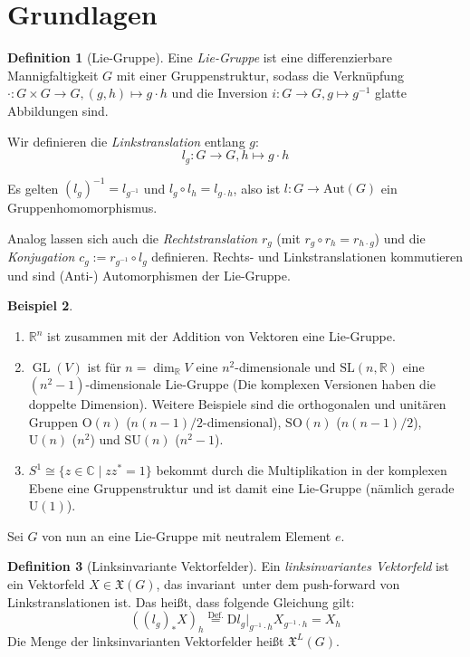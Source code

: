 \documentclass[a4paper]{scrreprt}
\numberwithin{equation}{chapter}
\newcommand{\DD}{\mathrm{D}}
\DeclareMathOperator{\GL}{GL}
\newcommand{\R}{\mathbb{R}}
\newcommand{\vf}{\mathfrak{X}}
\theoremstyle{definition}
\newtheorem{defn}{Definition}[section]
\newtheorem{bsp}[defn]{Beispiel}
\begin{document}
	\section{Grundlagen}
		\begin{defn}[Lie-Gruppe]
			Eine \emph{Lie-Gruppe} ist eine differenzierbare Mannigfaltigkeit $G$ mit einer Gruppenstruktur, sodass die Verknüpfung $\cdot\colon G\times G\rightarrow G, (g,h)\mapsto g\cdot h$ und die Inversion ${i\colon G\rightarrow G}, {g\mapsto g^{-1}}$ glatte Abbildungen sind.
			
			Wir definieren die \emph{Linkstranslation} entlang $g$:
			\begin{equation}
				l_g\colon G\to G, h\mapsto g\cdot h
			\end{equation}
			
			Es gelten $(l_g)^{-1}=l_{g^{-1}}$ und $l_g\circ l_h=l_{g\cdot h}$, also ist $l\colon G\rightarrow \mathrm{Aut}(G)$ ein Gruppenhomomorphismus.
			
			Analog lassen sich auch die \emph{Rechtstranslation} $r_g$ (mit $r_g\circ r_h=r_{h\cdot g}$) und die \emph{Konjugation} $c_g:= r_{g^{-1}}\circ l_g$ definieren. Rechts- und Linkstranslationen kommutieren und sind (Anti-) Automorphismen der Lie-Gruppe.
		\end{defn}
		\begin{bsp}\hfill
			\begin{enumerate}
				\item $\R^n$ ist zusammen mit der Addition von Vektoren eine Lie-Gruppe.
				\item $\GL(V)$ ist für $n=\dim_{\R} V$ eine $n^2$-dimensionale und $\mathrm{SL}(n,\R)$ eine $(n^2-1)$-dimensionale Lie-Gruppe (Die komplexen Versionen haben die doppelte Dimension). Weitere Beispiele sind die orthogonalen und unitären Gruppen $\mathrm{O}(n)$ ($n(n-1)/2$-dimensional), $\mathrm{SO}(n)$ ($n(n-1)/2$), $\mathrm{U}(n)$ ($n^2$) und $\mathrm{SU}(n)$ ($n^2-1$).
				\item $S^1\cong \lbrace z\in \mathbb{C}\mid zz^*=1\rbrace$ bekommt durch die Multiplikation in der komplexen Ebene eine Gruppenstruktur und ist damit eine Lie-Gruppe (nämlich gerade $\mathrm{U}(1)$). 
			\end{enumerate}
			
		\end{bsp}
		Sei $G$ von nun an eine Lie-Gruppe mit neutralem Element $e$.
		\begin{defn}[Linksinvariante Vektorfelder]
			Ein \emph{linksinvariantes Vektorfeld} ist ein Vektorfeld $X\in\mathfrak{X}(G)$, das \glqq invariant\grqq\ unter dem push-forward von Linkstranslationen ist. Das heißt, dass folgende Gleichung gilt:
			\begin{equation*}
				\left((l_g)_*X\right)_h\stackrel{\text{Def.}}{=}\DD l_g\vert_{g^{-1}\cdot h}X_{g^{-1}\cdot h}=X_h
			\end{equation*}
			Die Menge der linksinvarianten Vektorfelder heißt $\vf^L(G)$.
		\end{defn}
\end{document}
